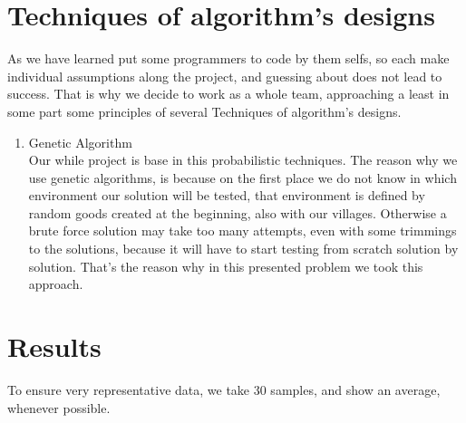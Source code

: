 \documentclass[twocolumn]{IEEEtran}
\begin{document}
\section{Techniques of algorithm's designs}

	As we have learned put some programmers to code by them selfs, so each make individual assumptions along  the project, and guessing about does not lead to success. That is why we decide to work as a whole team, approaching a least in some part some principles of several Techniques of algorithm's designs.
\begin{enumerate}
	\item Genetic Algorithm \\
    Our while project is base in this probabilistic techniques. The reason why we use genetic algorithms, is because on the first place we do not know in which environment our solution will be tested, that environment is defined by random goods created at the beginning, also with our villages. Otherwise a brute force solution may take too many attempts, even with some trimmings to the solutions, because it will have to start testing from scratch solution by solution. That's the reason why in this presented problem we took this approach. 


\end{enumerate}

\section{Results}

To ensure very representative data, we take 30 samples, and show an average, whenever possible.\\
\end{document}
